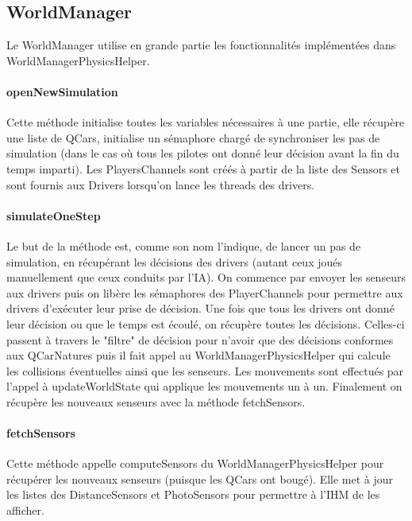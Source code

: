 \documentclass[a4paper, 12pt]{article}
\begin{document}
\subsection{WorldManager}
Le WorldManager utilise en grande partie les fonctionnalités implémentées dans WorldManagerPhysicsHelper. 
\paragraph{openNewSimulation} 
Cette méthode initialise toutes les variables nécessaires à une partie, elle récupère une liste de QCars, initialise un sémaphore chargé de synchroniser les pas de simulation (dans le cas où tous les pilotes ont donné leur décision avant la fin du temps imparti). Les PlayersChannels sont créés à partir de la liste des Sensors et sont fournis aux Drivers lorsqu'on lance les threads des drivers.
\paragraph{simulateOneStep}
Le but de la méthode est, comme son nom l'indique, de lancer un pas de simulation, en récupérant les décisions des drivers (autant ceux joués manuellement que ceux conduits par l'IA). On commence par envoyer les senseurs aux drivers puis on libère les sémaphores des PlayerChannels pour permettre aux drivers d'exécuter leur prise de décision. Une fois que tous les drivers ont donné leur décision ou que le temps est écoulé, on récupère toutes les décisions. Celles-ci passent à travers le "filtre" de décision pour n'avoir que des décisions conformes aux QCarNatures puis il fait appel au WorldManagerPhysicsHelper qui calcule les collisions éventuelles  ainsi que les senseurs. Les mouvements sont effectués par l'appel à updateWorldState qui applique les mouvements un à un. Finalement on récupère les nouveaux senseurs avec la méthode fetchSensors.
\paragraph{fetchSensors}
Cette méthode appelle computeSensors du WorldManagerPhysicsHelper pour récupérer les nouveaux senseurs (puisque les QCars ont bougé). Elle met à jour les listes des DistanceSensors et PhotoSensors pour permettre à l'IHM de les afficher.
\end{document}
